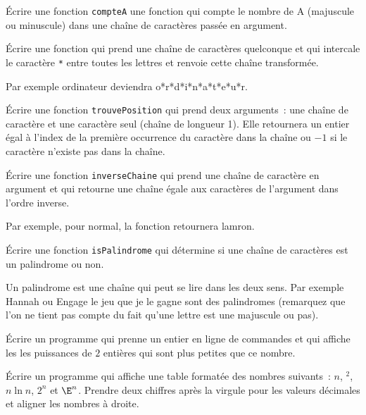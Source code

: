 \begin{exercice}
Écrire une fonction \texttt{compteA} une fonction qui compte le nombre de \textsf{A} (majuscule ou minuscule) dans une chaîne de caractères passée en argument.
\end{exercice}

\begin{exercice}
Écrire une fonction qui prend une chaîne de caractères quelconque et qui intercale le caractère \texttt{*} entre toutes les lettres et renvoie cette chaîne transformée.

Par exemple \textsf{ordinateur} deviendra \textsf{o*r*d*i*n*a*t*e*u*r}.
\end{exercice}

\begin{exercice}
Écrire une fonction \texttt{trouvePosition} qui prend deux arguments~: une chaîne de caractère et une caractère seul (chaîne de longueur 1). Elle retournera un entier égal à l'index de la première occurrence du caractère dans la chaîne ou $-1$ si le caractère n'existe pas dans la chaîne.
\end{exercice}

\begin{exercice}
Écrire une fonction \texttt{inverseChaine} qui prend une chaîne de caractère en argument et qui retourne une chaîne égale aux caractères de l'argument dans l'ordre inverse.

Par exemple, pour \textsf{normal}, la fonction retournera \textsf{lamron}.
\end{exercice}

\begin{exercice}[Palindromes]
Écrire une fonction \texttt{isPalindrome} qui détermine si une chaîne de caractères est un palindrome ou non.

Un palindrome est une chaîne qui peut se lire dans les deux sens. Par exemple \textsf{Hannah} ou \textsf{Engage le jeu que je le gagne} sont des palindromes (remarquez que l'on ne tient pas compte du fait qu'une lettre est une majuscule ou pas).
\end{exercice}

\begin{exercice}
Écrire un programme qui prenne un entier en ligne de commandes et qui affiche les les puissances de $2$ entières qui sont plus petites que ce nombre.
\end{exercice}

\begin{exercice}
Écrire un programme qui affiche une table formatée des nombres suivants~: $n$, $^2$, $n\ln n$, $2^n$ et $\E^n$. Prendre deux chiffres après la virgule pour les valeurs décimales et aligner les nombres à droite.
\end{exercice}

